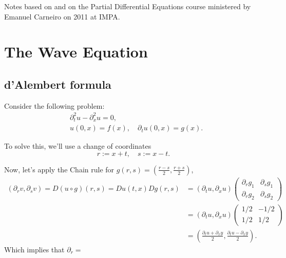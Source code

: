 Notes based on \citet{craig2018course} and on the Partial Differential Equations
course ministered by Emanuel Carneiro on 2011 at IMPA.

\section{The Wave Equation}

\subsection{d'Alembert formula}

Consider the following problem:
\begin{align*}
  &\partial_t^2 u - \partial^2_x u = 0,\\
  & u(0,x) = f(x), \quad \partial_t u(0,x) = g(x).
\end{align*}

To solve this, we'll use a change of coordinates 
\begin{displaymath}
  r := x + t, \quad s:= x -t. 
\end{displaymath}

Now, let's apply the Chain rule for $g(r,s) = (\frac{r-s}{2},\frac{r+s}{2})$,
\begin{align*}
  (\partial_r v, \partial_s v) = D(u\circ g)(r,s) = D u(t,x) D g(r,s)
  &= (\partial_t u, \partial_x u)
  \begin{pmatrix}
    \partial_r g_1 & \partial_s g_1 \\
    \partial_r g_2 & \partial_s g_2
  \end{pmatrix}\\
  &= (\partial_t u, \partial_x u)
  \begin{pmatrix}
    1/2 & -1/2 \\
    1/2 & 1/2 
  \end{pmatrix}\\
  &=
  \left(\frac{\partial_t u + \partial_x y}{2}, 
  \frac{\partial_t u - \partial_x y}{2}\right).
\end{align*}
Which implies that $\partial_r = $




